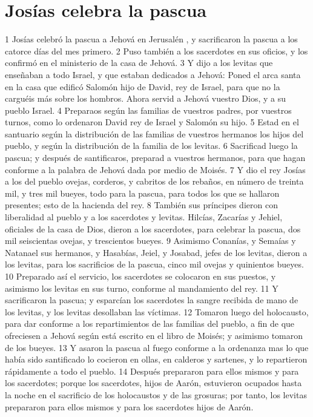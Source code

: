 \section*{Josías celebra la pascua }

 

1 Josías celebró la pascua a Jehová en Jerusalén , y sacrificaron la pascua a los catorce días del mes primero.
2 Puso también a los sacerdotes en sus oficios, y los confirmó en el ministerio de la casa de Jehová.
3 Y dijo a los levitas que enseñaban a todo Israel, y que estaban dedicados a Jehová: Poned el arca santa en la casa que edificó Salomón hijo de David, rey de Israel, para que no la carguéis más sobre los hombros. Ahora servid a Jehová vuestro Dios, y a su pueblo Israel.
4 Preparaos según las familias de vuestros padres, por vuestros turnos, como lo ordenaron David rey de Israel y Salomón su hijo. 
5 Estad en el santuario según la distribución de las familias de vuestros hermanos los hijos del pueblo, y según la distribución de la familia de los levitas.
6 Sacrificad luego la pascua; y después de santificaros, preparad a vuestros hermanos, para que hagan conforme a la palabra de Jehová dada por medio de Moisés.
7 Y dio el rey Josías a los del pueblo ovejas, corderos, y cabritos de los rebaños, en número de treinta mil, y tres mil bueyes, todo para la pascua, para todos los que se hallaron presentes; esto de la hacienda del rey.
8 También sus príncipes dieron con liberalidad al pueblo y a los sacerdotes y levitas. Hilcías, Zacarías y Jehiel, oficiales de la casa de Dios, dieron a los sacerdotes, para celebrar la pascua, dos mil seiscientas ovejas, y trescientos bueyes.
9 Asimismo Conanías, y Semaías y Natanael sus hermanos, y Hasabías, Jeiel, y Josabad, jefes de los levitas, dieron a los levitas, para los sacrificios de la pascua, cinco mil ovejas y quinientos bueyes.
10 Preparado así el servicio, los sacerdotes se colocaron en sus puestos, y asimismo los levitas en sus turno, conforme al mandamiento del rey.
11 Y sacrificaron la pascua; y esparcían los sacerdotes la sangre recibida de mano de los levitas, y los levitas desollaban las víctimas.
12 Tomaron luego del holocausto, para dar conforme a los repartimientos de las familias del pueblo, a fin de que ofreciesen a Jehová según está escrito en el libro de Moisés; y asimismo tomaron de los bueyes.
13 Y asaron la pascua al fuego conforme a la ordenanza  mas lo que había sido santificado lo cocieron en ollas, en calderos y sartenes, y lo repartieron rápidamente a todo el pueblo.
14 Después prepararon para ellos mismos y para los sacerdotes; porque los sacerdotes, hijos de Aarón, estuvieron ocupados hasta la noche en el sacrificio de los holocaustos y de las grosuras; por tanto, los levitas prepararon para ellos mismos y para los sacerdotes hijos de Aarón.
